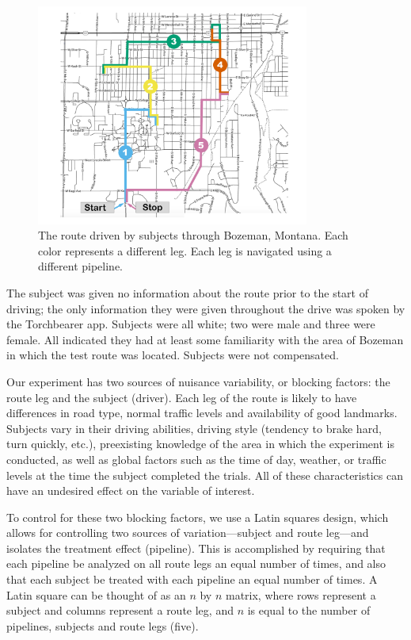 \begin{figure}[htbp]
  \centering
  \includegraphics[width=0.8\textwidth]{images/route.pdf}
  \caption{The route driven by subjects through Bozeman, Montana. Each color represents a different leg. Each leg is navigated using a different pipeline.}
  \label{fig:route}
\end{figure}

The subject was given no information about the route prior to the start of driving; the only information they were given throughout the drive was spoken by the Torchbearer app. Subjects were all white; two were male and three were female. All indicated they had at least some familiarity with the area of Bozeman in which the test route was located. Subjects were not compensated.

Our experiment has two sources of nuisance variability, or blocking factors: the route leg and the subject (driver). Each leg of the route is likely to have differences in road type, normal traffic levels and availability of good landmarks. Subjects vary in their driving abilities, driving style (tendency to brake hard, turn quickly, etc.), preexisting knowledge of the area in which the experiment is conducted, as well as global factors such as the time of day, weather, or traffic levels at the time the subject completed the trials. All of these characteristics can have an undesired effect on the variable of interest. 

To control for these two blocking factors, we use a Latin squares design, which allows for controlling two sources of variation---subject and route leg---and isolates the treatment effect (pipeline). This is accomplished by requiring that each pipeline be analyzed on all route legs an equal number of times, and also that each subject be treated with each pipeline an equal number of times. A Latin square can be thought of as an $n$ by $n$ matrix, where rows represent a subject and columns represent a route leg, and $n$ is equal to the number of pipelines, subjects and route legs (five).

